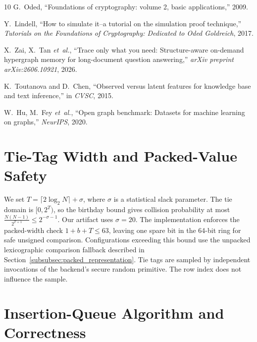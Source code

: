 \documentclass[conference,compsoc,letterpaper]{IEEEtran}
\theoremstyle{definition}
\theoremstyle{remark}
\begin{document}
\begin{thebibliography}{10}
G.~Oded, ``Foundations of cryptography: volume 2, basic applications,'' 2009.

Y.~Lindell, ``How to simulate it--a tutorial on the simulation proof
  technique,'' \emph{Tutorials on the Foundations of Cryptography: Dedicated to
  Oded Goldreich}, 2017.

X.~Zai, X.~Tan \emph{et~al.}, ``Trace only what you need: Structure-aware
  on-demand hypergraph memory for long-document question answering,''
  \emph{arXiv preprint arXiv:2606.10921}, 2026.

K.~Toutanova and D.~Chen, ``Observed versus latent features for knowledge base
  and text inference,'' in \emph{CVSC}, 2015.

W.~Hu, M.~Fey \emph{et~al.}, ``Open graph benchmark: Datasets for machine
  learning on graphs,'' \emph{NeurIPS}, 2020.

\end{thebibliography}
\endgroup

\clearpage
\appendices

\section{Tie-Tag Width and Packed-Value Safety}
\label{app:tie_tag_width}
\vspace{-3mm}

We set $T=\lceil 2\log_2 N\rceil+\sigma$, where $\sigma$ is a statistical slack parameter.
The tie domain is $[0,2^T)$, so the birthday bound gives collision probability at most $\frac{N(N-1)}{2^{T+1}} \le 2^{-\sigma-1}$.
Our artifact uses $\sigma=20$.
The implementation enforces the packed-width check $1+b+T\le 63$, leaving one spare bit in the 64-bit ring for safe unsigned comparison.
Configurations exceeding this bound use the unpacked lexicographic comparison fallback described in Section~\ref{subsubsec:packed_representation}.
Tie tags are sampled by independent invocations of the backend's secure random primitive.
The row index does not influence the sample.

\section{Insertion-Queue Algorithm and Correctness}
\label{app:correctness_proof}
\vspace{-3mm}
\end{document}
